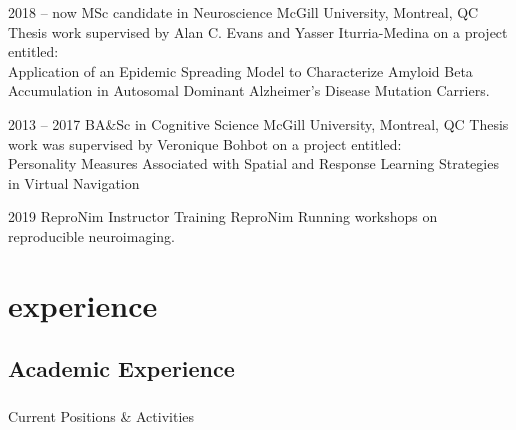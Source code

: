 \documentclass[]{friggeri-cv} %
\begin{document}
\begin{entrylist}


\entry
{2018 -- now}
{MSc candidate {\normalfont in Neuroscience}}
{McGill University, Montreal, QC}
{Thesis work supervised by Alan C. Evans and Yasser Iturria-Medina on a project entitled:\\ 
Application of an Epidemic Spreading Model to Characterize Amyloid Beta Accumulation in Autosomal Dominant Alzheimer’s Disease Mutation Carriers.
}

\entry
{2013 -- 2017}
{BA&Sc {\normalfont in Cognitive Science}}
{McGill University, Montreal, QC}
{Thesis work was supervised by Veronique Bohbot on a project entitled:\\ 
Personality Measures Associated with Spatial and Response Learning Strategies
in Virtual Navigation}


\entry
{2019}
{ReproNim Instructor Training}
{ReproNim}
{Running workshops on reproducible neuroimaging.}



\end{entrylist}


\section{experience}

\subsection{Academic Experience}

\subsubsection{}{Current Positions \& Activities}
\end{document}
